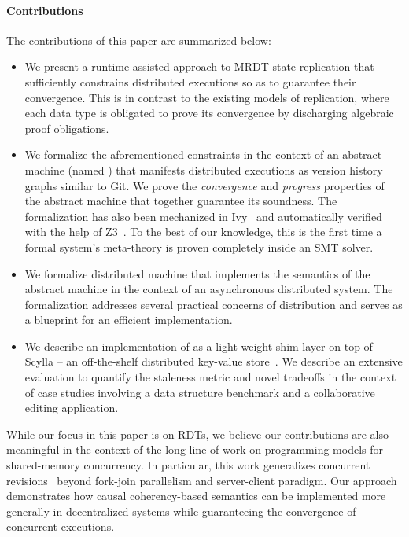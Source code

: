 \paragraph{Contributions} The contributions of this paper are summarized
below:
\begin{itemize}
  \item We present a runtime-assisted approach to MRDT state
    replication that sufficiently constrains distributed executions so
    as to guarantee their convergence. This is in contrast to the
    existing models of replication, where each data type is obligated
    to prove its convergence by discharging algebraic proof
    obligations.

  \item We formalize the aforementioned constraints in the context of
    an abstract machine (named \quark) that manifests distributed
    executions as version history graphs similar to Git.  We prove the
    \emph{convergence} and \emph{progress} properties of the \quark
    abstract machine that together guarantee its soundness. The
    formalization has also been mechanized in Ivy~\cite{ivy} and
    automatically verified with the help of Z3~\cite{z3}. To the best
    of our knowledge, this is the first time a formal system's
    meta-theory is proven completely inside an SMT solver.

  \item We formalize \quark distributed machine that implements the
    semantics of the \quark abstract machine in the context of an
    asynchronous distributed system. The formalization addresses
    several practical concerns of distribution and serves as a
    blueprint for an efficient implementation.

  \item We describe an implementation of \quark as a light-weight shim
    layer on top of Scylla -- an off-the-shelf distributed key-value
    store~\cite{scylla}. We describe an extensive evaluation to
    quantify the staleness metric and novel tradeoffs in the context
    of case studies involving a data structure benchmark and a
    collaborative editing application. 
\end{itemize}

While our focus in this paper is on RDTs, we believe our contributions
are also meaningful in the context of the long line of work on
programming models for shared-memory concurrency. In particular, this
work generalizes concurrent revisions~\cite{BBL+10} beyond fork-join
parallelism and server-client paradigm. Our approach demonstrates how
causal coherency-based semantics can be implemented more generally in
decentralized systems while guaranteeing the convergence of concurrent
executions.


